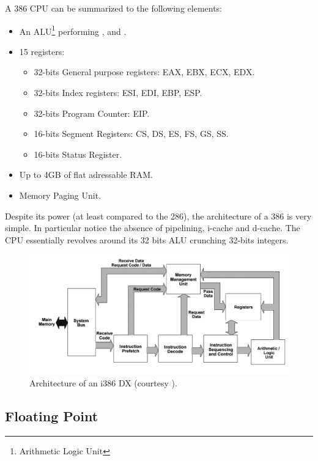 \documentclass[book.tex]{subfiles}
\begin{document}
A 386 CPU can be summarized to the following elements:
\begin{itemize}
\item An ALU\footnote{Arithmetic Logic Unit} performing ,  and .
\item 15 registers:
\begin{itemize}
  \item 32-bits General purpose registers: EAX, EBX, ECX, EDX.
  \item 32-bits Index registers: ESI, EDI, EBP, ESP.
  \item 32-bits Program Counter: EIP.
  \item 16-bits Segment Registers: CS, DS, ES, FS, GS, SS.
  \item 16-bits Status Register.
\end{itemize}
\item Up to 4GB of flat adressable RAM.
\item Memory Paging Unit.
\end{itemize}
 
\par
Despite its power (at least compared to the 286), the architecture of a 386 is very simple. In particular notice the absence of pipelining, i-cache and d-cache. The CPU essentially revolves around its 32 bits ALU crunching 32-bits integers.

\begin{figure}[H]
\centering
  
      \includegraphics[width=\textwidth]{imgs/drawings/80386DX_arch.png}
\caption{Architecture of an i386 DX (courtesy ).}
\end{figure}








  \subsection{Floating Point}
  
\end{document}
